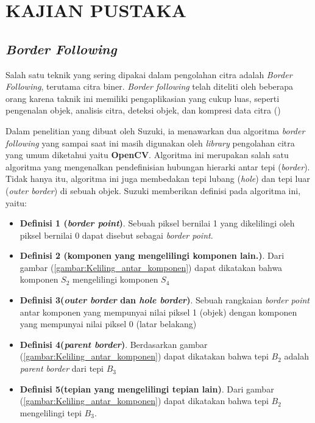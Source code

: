
\chapter{KAJIAN PUSTAKA} 

\section{\emph{Border Following}}

Salah satu teknik yang sering dipakai dalam pengolahan citra 
adalah \textit{Border Following}, terutama citra biner. 
\textit{Border following} telah diteliti oleh beberapa orang 
karena taknik ini memiliki pengaplikasian yang cukup luas, 
seperti pengenalan objek, analisis citra, deteksi objek, dan 
kompresi data citra (\cite{Suzuki})

Dalam penelitian yang dibuat oleh Suzuki, ia menawarkan 
dua algoritma \textit{border following} yang sampai saat ini 
masih digunakan oleh \textit{library} pengolahan citra yang 
umum diketahui yaitu \textbf{OpenCV}. Algoritma ini merupakan 
salah satu algoritma yang mengenalkan pendefinisian hubungan 
hierarki antar tepi (\textit{border}). Tidak hanya itu, 
algoritma ini juga membedakan tepi lubang (\textit{hole}) 
dan tepi luar (\textit{outer border}) di sebuah objek. 
Suzuki memberikan definisi pada algoritma ini, yaitu:
\begin{itemize}
	\item \textbf{Definisi 1 (\textit{border point})}.
	Sebuah piksel bernilai 1 yang dikelilingi oleh piksel
	bernilai 0 dapat disebut sebagai \textit{border point}.

	\item \textbf{Definisi 2 (komponen yang mengelilingi
	komponen lain.)}. Dari gambar 
	(\ref{gambar:Keliling_antar_komponen}) dapat dikatakan 
	bahwa komponen $S_2$ mengelilingi komponen $S_4$

	\item \textbf{Definisi 3(\textit{outer border} dan \textit{hole border})}. 
	Sebuah rangkaian \textit{border point} antar komponen yang 
	mempunyai nilai piksel 1 (objek) dengan komponen yang 
	mempunyai nilai piksel 0 (latar belakang)

	\item \textbf{Definisi 4(\textit{parent border})}. 
	Berdasarkan gambar (\ref{gambar:Keliling_antar_komponen}) 
	dapat dikatakan bahwa tepi $B_2$ adalah 
	\textit{parent border} dari tepi $B_3$

	\item \textbf{Definisi 5(tepian yang mengelilingi tepian 
	lain)}. Dari gambar (\ref{gambar:Keliling_antar_komponen}) 
	dapat dikatakan bahwa tepi $B_2$ mengelilingi tepi $B_3$.
\end{itemize}

